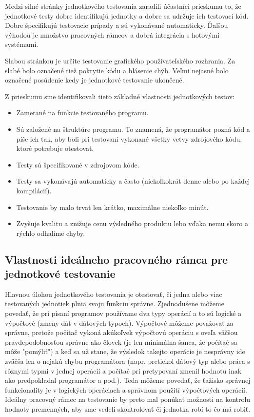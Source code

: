 \documentclass[11pt,twoside,slovak,a4paper]{article}
\begin{document}
	Medzi silné stránky jednotkového testovania zaradili účastníci prieskumu to, že jednotkové testy dobre identifikujú jednotky a dobre sa udržuje ich testovací kód. Dobre špecifikujú testovacie prípady a sú vykonávané automaticky. Ďalšou výhodou je množstvo pracovných rámcov a dobrá integrácia s hotovými systémami.
	
	Slabou stránkou je určite testovanie grafického používateľského rozhrania. Za slabé bolo označené tiež pokrytie kódu a hlásenie chýb. Veľmi nejasné bolo označené posúdenie kedy je jednotkové testovanie ukončené.\newline
	
	
	Z prieskumu\cite{Runeson2006} sme identifikovali tieto základné vlastnosti jednotkových testov:
		\begin{itemize}
			\item Zamerané na funkcie testovaného programu.
			\item Sú založené na štruktúre programu. To znamená, že programátor pozná kód a píše ich tak, aby boli pri testovaní vykonané všetky vetvy zdrojového kódu, ktoré potrebuje otestovať.
			\item Testy sú špecifikované v zdrojovom kóde.
			\item Testy sa vykonávajú automaticky a často (niekoľkokrát denne alebo po každej kompilácií).
			\item Testovanie by malo trvať len krátko, maximálne niekoľko minút.
			\item Zvyšuje kvalitu a znižuje cenu výsledného produktu lebo vďaka nemu skoro a rýchlo odhalíme chyby.
		\end{itemize}
		
	\subsection{Vlastnosti ideálneho pracovného rámca pre jednotkové testovanie}
	
		Hlavnou úlohou jednotkového testovania je otestovať, či jedna alebo viac testovaných jednotiek plnia svoju funkciu správne. Zjednodušene môžeme povedať, že pri písaní programov používame dva typy operácií a to sú logické a výpočtové (zmeny dát v dátových typoch). Výpočtové môžeme považovať za správne, pretože počítač vykoná akúkoľvek výpočtovú operáciu s oveľa väčšou pravdepodobnosťou správne ako človek (je len minimálna šanca, že počítač sa môže "pomýliť") a keď sa už stane, že výsledok takejto operácie je nesprávny ide zväčša len o nejakú chybu programátora (napr. pretiekol dátový typ alebo práca s rôznymi typmi v jednej operácií a počítač pri pretypovaní zmenil hodnotu inak ako predpokladal programátor a pod.). Teda môžeme povedať, že ťažisko správnej funkcionality je v logických operáciach a správnom použití výpočtových operácií. Ideálny pracovný rámec na testovanie by preto mal ponúkať možnosti na kontrolu hodnoty premenných, aby sme vedeli skontrolovať či jednotka robí to čo má robiť.
		
\end{document}
